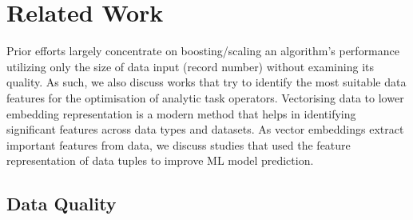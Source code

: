 \section{Related Work}
Prior efforts largely concentrate on boosting/scaling an algorithm's performance utilizing only the size of data input (record number) without examining its quality. As such, we also discuss works that try to identify the most suitable data features for the optimisation of analytic task operators. Vectorising data to lower embedding representation is a modern method that helps in identifying significant features across data types and datasets. As vector embeddings extract important features from data, we discuss studies that used the feature representation of data tuples to improve ML model prediction.

\subsection{Data Quality}

